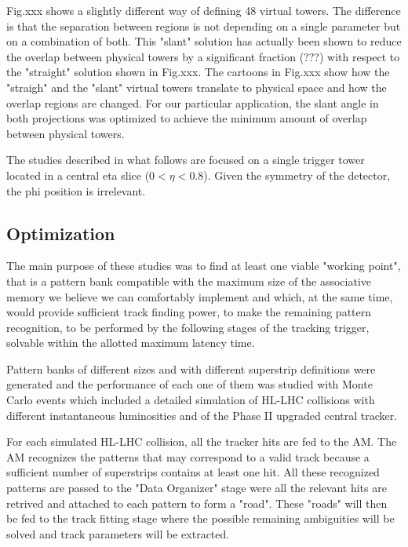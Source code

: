 Fig.xxx shows a slightly different way of defining 48 virtual towers. The difference is that the separation between regions is not depending on a single parameter but on a combination of both. This "slant" solution has actually been shown to reduce the overlap between physical towers by a significant fraction (???) with respect to the "straight" solution shown in Fig.xxx. The cartoons in Fig.xxx show how the "straigh" and the "slant" virtual towers translate to physical space and how the overlap regions are changed. For our particular application, the slant angle in both projections was optimized to achieve the minimum amount of overlap between physical towers.

The studies described in what follows are focused on a single trigger tower located in a central eta slice ($0 < \eta < 0.8$). Given the symmetry of the detector, the phi position is irrelevant.



\subsection{Optimization}


The main purpose of these studies was to find at least one viable "working point", that is a pattern bank compatible with the maximum size of the associative memory we believe we can comfortably implement and which, at the same time, would provide sufficient track finding power, to make the remaining pattern recognition, to be performed by the following stages of the tracking trigger, solvable within the allotted maximum latency time.

Pattern banks of different sizes and with different superstrip definitions were generated and the performance of each one of them was studied with Monte Carlo events which included a detailed simulation of HL-LHC collisions with different instantaneous luminosities and of the Phase II upgraded central tracker. 

For each simulated HL-LHC collision, all the tracker hits are fed to the AM. The AM recognizes the patterns that may correspond to a valid track because a sufficient number of superstrips contains at least one hit. All these recognized patterns are passed to the "Data Organizer" stage were all the relevant hits are retrived and attached to each pattern to form a "road". These "roads" will then be fed to the track fitting stage where the possible remaining ambiguities will be solved and track parameters will be extracted.

